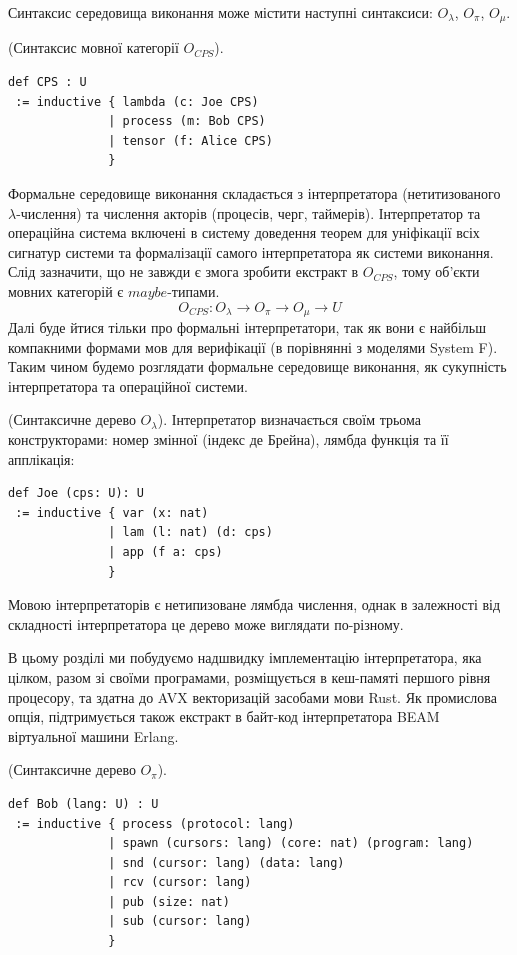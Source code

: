 Синтаксис середовища виконання може містити наступні синтаксиси:
$O_\lambda$, $O_\pi$, $O_\mu$.

\begin{definition} (Синтаксис мовної категорії $O_{CPS}$).
\begin{lstlisting}
def CPS : U
 := inductive { lambda (c: Joe CPS)
              | process (m: Bob CPS)
              | tensor (f: Alice CPS)
              }
\end{lstlisting}
\end{definition}

Формальне середовище виконання складається з інтерпретатора
(нетитизованого $\lambda$-числення) та числення акторів (процесів, черг, таймерів).
Інтерпретатор та операційна система включені в систему доведення теорем
для уніфікації всіх сигнатур системи та формалізації самого інтерпретатора
як системи виконання. Слід зазначити, що не
завжди є змога зробити екстракт в $O_{CPS}$, тому об'єкти мовних
категорій є $maybe$-типами.
$$
O_{CPS}: O_\lambda \rightarrow O_\pi \rightarrow O_\mu \rightarrow U
$$
Далі буде йтися тільки про формальні інтерпретатори,
так як вони є найбільш компакними формами мов для
верифікації (в порівнянні з моделями System F).
Таким чином будемо розглядати формальне середовище виконання, як
сукупність інтерпретатора та операційної системи.

\begin{definition} (Синтаксичне дерево $O_\lambda$). Інтерпретатор визначається
своїм трьома конструкторами: номер змінної (індекс де Брейна),
лямбда функція та її апплікація:
\begin{lstlisting}
def Joe (cps: U): U
 := inductive { var (x: nat)
              | lam (l: nat) (d: cps)
              | app (f a: cps)
              }
\end{lstlisting}
Мовою інтерпретаторів є нетипизоване лямбда числення, однак в залежності
від складності інтерпретатора це дерево може виглядати по-різному.
\end{definition}

В цьому розділі ми побудуємо надшвидку імплементацію інтерпретатора,
яка цілком, разом зі своїми програмами, розміщується в кеш-памяті
першого рівня процесору, та здатна до AVX векторизацій засобами мови Rust.
Як промислова опція, підтримується також екстракт
в байт-код інтерпретатора BEAM віртуальної машини Erlang.

\begin{definition} (Синтаксичне дерево $O_\pi$).
\begin{lstlisting}
def Bob (lang: U) : U
 := inductive { process (protocol: lang)
              | spawn (cursors: lang) (core: nat) (program: lang)
              | snd (cursor: lang) (data: lang)
              | rcv (cursor: lang)
              | pub (size: nat)
              | sub (cursor: lang)
              }
\end{lstlisting}
\end{definition}

